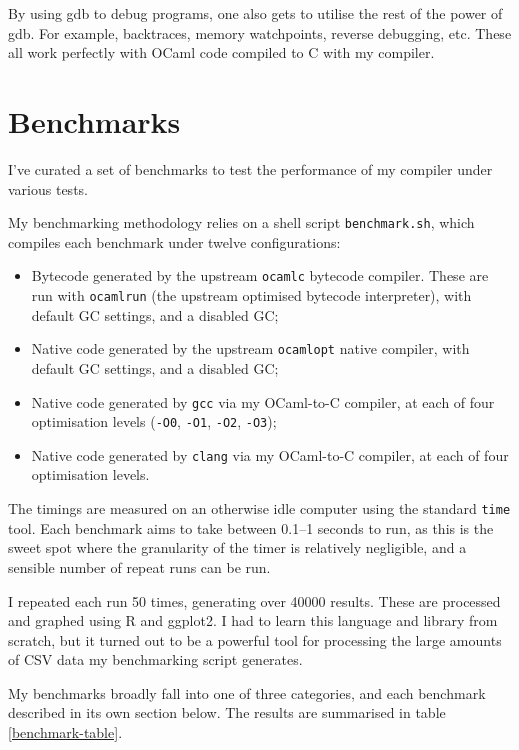 \documentclass[12pt,a4paper,twoside,openright]{report}
\begin{document}
By using gdb to debug programs, one also gets to utilise the rest of the power of gdb. For example,
backtraces, memory watchpoints, reverse debugging, etc. These all work perfectly with OCaml
code compiled to C with my compiler.

\section{Benchmarks}\label{benchmarks}

I've curated a set of benchmarks to test the performance of my compiler under
various tests.

My benchmarking methodology relies on a shell script \lstinline!benchmark.sh!,
which compiles each benchmark under twelve configurations:
\begin{itemize}
    \item Bytecode generated by the upstream \lstinline!ocamlc! bytecode compiler. These are run with \lstinline!ocamlrun! (the upstream optimised bytecode interpreter), with default GC settings, and a disabled GC;
    \item Native code generated by the upstream \lstinline!ocamlopt! native compiler, with default GC settings, and a disabled GC;
    \item Native code generated by \lstinline!gcc! via my OCaml-to-C compiler, at each of four optimisation levels (\lstinline!-O0!, \lstinline!-O1!, \lstinline!-O2!, \lstinline!-O3!);
    \item Native code generated by \lstinline!clang! via my OCaml-to-C compiler, at each of four optimisation levels.
\end{itemize}

The timings are measured on an otherwise idle computer using the standard \lstinline!time! tool. Each
benchmark aims to take between 0.1--1 seconds to run, as this is the sweet spot
where the granularity of the timer is relatively negligible, and a sensible
number of repeat runs can be run.

I repeated each run 50 times, generating over 40000 results. These are
processed and graphed using R and ggplot2. I had to learn this language and
library from scratch, but it turned out to be a powerful tool for processing
the large amounts of CSV data my benchmarking script generates.

My benchmarks broadly fall into one of three categories, and each benchmark described in its own section below. The results are summarised in table \ref{benchmark-table}.
\end{document}
